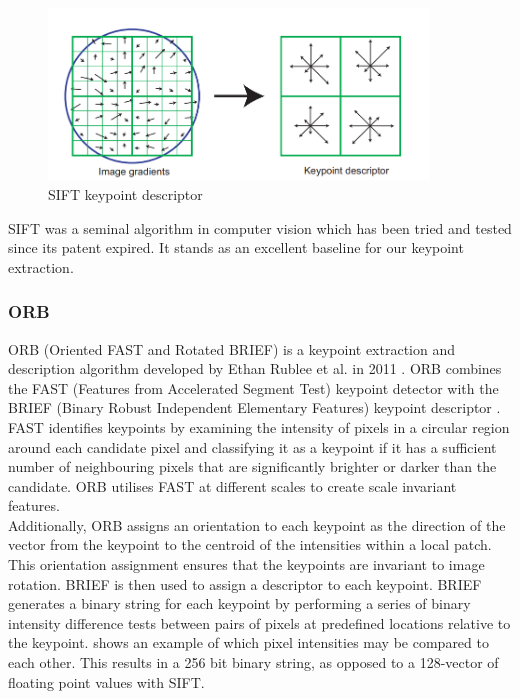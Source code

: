 \begin{figure}[h]
    \centering
    \includegraphics[width=0.9\textwidth]{figures/SIFT.png}
    \caption{SIFT keypoint descriptor \cite{SIFT}}
    \label{fig:SIFT}
\end{figure}

SIFT was a seminal algorithm in computer vision which has been tried and tested since its patent expired. It stands as an excellent baseline for our keypoint extraction.

\subsubsection{ORB}
ORB (Oriented FAST and Rotated BRIEF) is a keypoint extraction and description algorithm developed by Ethan Rublee et al. in 2011 \cite{ORB}. ORB combines the FAST (Features from Accelerated Segment Test) keypoint detector \cite{FAST} with the BRIEF (Binary Robust Independent Elementary Features) keypoint descriptor \cite{BRIEF}.\\

FAST identifies keypoints by examining the intensity of pixels in a circular region around each candidate pixel and classifying it as a keypoint if it has a sufficient number of neighbouring pixels that are significantly brighter or darker than the candidate. ORB utilises FAST at different scales to create scale invariant features.\\

Additionally, ORB assigns an orientation to each keypoint as the direction of the vector from the keypoint to the centroid of the intensities within a local patch. This orientation assignment ensures that the keypoints are invariant to image rotation.
BRIEF is then used to assign a descriptor to each keypoint. BRIEF generates a binary string for each keypoint by performing a series of binary intensity difference tests between pairs of pixels at predefined locations relative to the keypoint.  shows an example of which pixel intensities may be compared to each other. This results in a 256 bit binary string, as opposed to a 128-vector of floating point values with SIFT.\\

